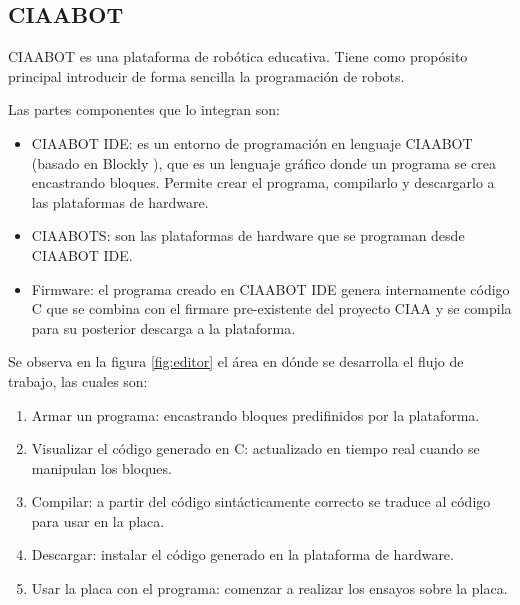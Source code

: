 \subsection{CIAABOT}
\label{CIAABOT}

CIAABOT es una plataforma de robótica educativa. Tiene como propósito principal introducir
de forma sencilla la programación de robots.

Las partes componentes que lo integran son:

\begin{itemize}
	\item CIAABOT IDE: es un entorno de programación en lenguaje CIAABOT (basado en  Blockly \citep{blockly}), que es un lenguaje gráfico donde un programa se crea encastrando bloques. Permite crear el programa, compilarlo y descargarlo a las plataformas de hardware.
	\item CIAABOTS: son las plataformas de hardware que se programan desde CIAABOT IDE. 
	\item Firmware: el programa creado en CIAABOT IDE genera internamente código C que se combina con el firmare pre-existente del proyecto CIAA y se compila para su posterior descarga a la plataforma.
\end{itemize}

Se observa en la figura \ref{fig:editor} el área en dónde se desarrolla el flujo de trabajo, las cuales son:

\begin{enumerate}
	\item Armar un programa: encastrando bloques predifinidos por
	la plataforma.	
	\item Visualizar el código generado en C: actualizado en tiempo real cuando se
	manipulan los bloques.
	\item Compilar: a partir del código sintácticamente correcto se traduce al código
	para usar en la placa.
	\item Descargar: instalar el código generado en la plataforma de hardware.
	\item Usar la placa con el programa: comenzar a realizar los ensayos sobre la placa.
\end{enumerate}

